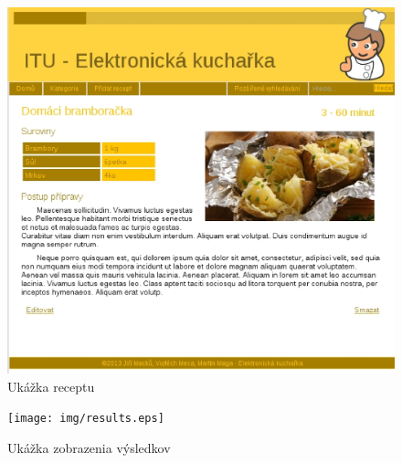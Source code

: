 \documentclass[12pt,a4paper,titlepage,final]{article}
\begin{document}
\begin{figure}

\begin{center}

\includegraphics[scale=0.7]{img/recept.eps} 
\caption{Ukážka receptu}


\end{center}

\end{figure}


\begin{figure}

\begin{center}

\texttt{[image: img/results.eps]} 
\caption{Ukážka zobrazenia výsledkov}


\end{center}

\end{figure}
\end{document}
